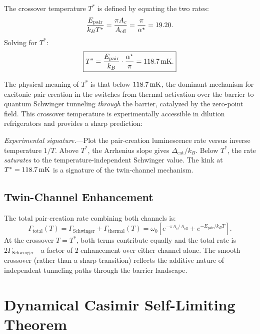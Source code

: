 \documentclass[11pt,letterpaper]{article}
\begin{document}
The crossover temperature $T^*$ is defined by equating the two rates:
\begin{equation}
\frac{E_{\text{pair}}}{k_B T^*} = \frac{\pi A_c}{A_{\text{eff}}} = \frac{\pi}{\alpha^\star} = 19.20.
\end{equation}
Solving for $T^*$:
\begin{equation}
\boxed{T^* = \frac{E_{\text{pair}}}{k_B} \cdot \frac{\alpha^\star}{\pi} = 118.7\,\mathrm{mK}.}
\label{eq:crossover_T}
\end{equation}

The physical meaning of $T^*$ is that below $118.7\,\mathrm{mK}$, the dominant mechanism for excitonic pair creation in the \TEVC{} switches from thermal activation over the barrier to quantum Schwinger tunneling \textit{through} the barrier, catalyzed by the zero-point field. This crossover temperature is experimentally accessible in dilution refrigerators and provides a sharp prediction:

\textit{Experimental signature.}---Plot the pair-creation luminescence rate versus inverse temperature $1/T$. Above $T^*$, the Arrhenius slope gives $\Delta_{\text{cat}}/k_B$. Below $T^*$, the rate \textit{saturates} to the temperature-independent Schwinger value. The kink at $T^* = 118.7\,\mathrm{mK}$ is a signature of the twin-channel mechanism.

\subsection{Twin-Channel Enhancement}

The total pair-creation rate combining both channels is:
\begin{equation}
\Gamma_{\text{total}}(T) = \Gamma_{\text{Schwinger}} + \Gamma_{\text{thermal}}(T) = \omega_0 \left[ e^{-\pi A_c / A_{\text{eff}}} + e^{-E_{\text{pair}} / k_B T} \right].
\label{eq:twin_channel}
\end{equation}
At the crossover $T = T^*$, both terms contribute equally and the total rate is $2\Gamma_{\text{Schwinger}}$---a factor-of-2 enhancement over either channel alone. The smooth crossover (rather than a sharp transition) reflects the additive nature of independent tunneling paths through the barrier landscape.

\section{Dynamical Casimir Self-Limiting Theorem}
\label{sec:dce_selflimit}
\end{document}

